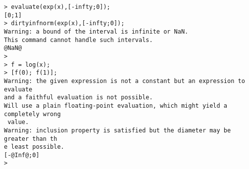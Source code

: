 \begin{center}\begin{minipage}{15cm}\begin{Verbatim}[frame=single]
> evaluate(exp(x),[-infty;0]);
[0;1]
> dirtyinfnorm(exp(x),[-infty;0]);
Warning: a bound of the interval is infinite or NaN.
This command cannot handle such intervals.
@NaN@
> 
> f = log(x);
> [f(0); f(1)];
Warning: the given expression is not a constant but an expression to evaluate
and a faithful evaluation is not possible.
Will use a plain floating-point evaluation, which might yield a completely wrong
 value.
Warning: inclusion property is satisfied but the diameter may be greater than th
e least possible.
[-@Inf@;0]
> 
\end{Verbatim}
\end{minipage}\end{center}
